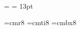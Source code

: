 


\magnification= 
\parskip=0pt
\baselineskip= 13pt
\hsize 5.25in


\font\smallrm=cmr8
\font\smallit=cmti8
\font\smallbf=cmbx8
\def\a{\alpha}
\def\b{\beta}
\def\g{\gamma} \def\G{\Gamma}
\def\d{\delta} \def\D{\Delta}
\def\e{\varepsilon}
\def\h{\eta}
\def\k{\kappa}
\def\l{\lambda} \def\L{\Lambda}
\def\m{\mu}
\def\f{\phi} \def\F{\Phi}
\def\n{\nu}
\def\j{\psi} \def\J{\Psi}
\def\r{\rho}
\def\s{\sigma} \def\S{\Sigma}
\def\t{\tau}
\def\th{\theta} \def\thh{\vartheta} \def\Th{\Theta}
\def\x{\xi} \def\X{\Xi}
\def\ch{\chi}
\def\w{\omega} \def\W{\Omega}
\def\v{\varphi}
\def\z{\zeta}
\def\om{\omega}
\def\slash{\llap /}
\def\Lagr{{\cal L}}
\def\pa{\partial}
\def\ddt{{{\rm d}\over{\rm d}t}}
\def\o{\over}
\def\Hin{{\rm {\cal H}_{in}^{BH}}}
\def\Hout{{\rm {\cal H}_{out}^{WH}}}

\def\today{September 27, 1993}

\def\thedate#1{\rightline{#1}}

